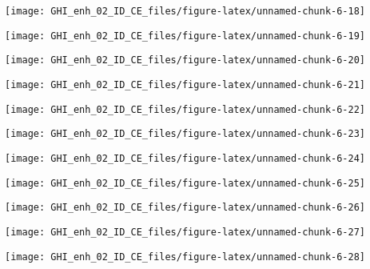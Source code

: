 \documentclass[
  10pt,
  a4paper,oneside]{article}
\begin{document}
\begin{center}\texttt{[image: GHI\_enh\_02\_ID\_CE\_files/figure-latex/unnamed-chunk-6-18]} \end{center}

\begin{center}\texttt{[image: GHI\_enh\_02\_ID\_CE\_files/figure-latex/unnamed-chunk-6-19]} \end{center}

\begin{center}\texttt{[image: GHI\_enh\_02\_ID\_CE\_files/figure-latex/unnamed-chunk-6-20]} \end{center}

\begin{center}\texttt{[image: GHI\_enh\_02\_ID\_CE\_files/figure-latex/unnamed-chunk-6-21]} \end{center}

\begin{center}\texttt{[image: GHI\_enh\_02\_ID\_CE\_files/figure-latex/unnamed-chunk-6-22]} \end{center}

\begin{center}\texttt{[image: GHI\_enh\_02\_ID\_CE\_files/figure-latex/unnamed-chunk-6-23]} \end{center}

\begin{center}\texttt{[image: GHI\_enh\_02\_ID\_CE\_files/figure-latex/unnamed-chunk-6-24]} \end{center}

\begin{center}\texttt{[image: GHI\_enh\_02\_ID\_CE\_files/figure-latex/unnamed-chunk-6-25]} \end{center}

\begin{center}\texttt{[image: GHI\_enh\_02\_ID\_CE\_files/figure-latex/unnamed-chunk-6-26]} \end{center}

\begin{center}\texttt{[image: GHI\_enh\_02\_ID\_CE\_files/figure-latex/unnamed-chunk-6-27]} \end{center}

\begin{center}\texttt{[image: GHI\_enh\_02\_ID\_CE\_files/figure-latex/unnamed-chunk-6-28]} \end{center}
\end{document}
